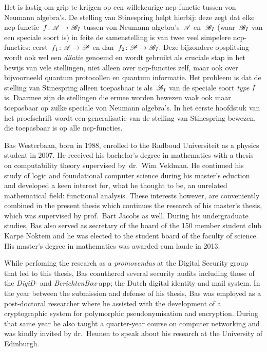 Het is lastig om grip te krijgen
    op een willekeurige ncp-functie
    tussen von Neumann algebra's.
De stelling van Stinespring helpt hierbij:
    deze zegt dat elke ncp-functie~$f\colon \mathscr{A} \to \mathscr{B}_I$
    tussen von Neumann algebra's~$\mathscr{A}$ en~$\mathscr{B}_I$
        (waar~$\mathscr{B}_I$ van een speciale soort is)
        in feite de samenstelling is
        van twee veel simpelere ncp-functies:
        eerst~$f_1\colon \mathscr{A} \to \mathscr{P}$
            en dan~$f_2\colon \mathscr{P} \to \mathscr{B}_I$.
    Deze bijzondere opsplitsing wordt
        ook wel een \emph{dilatie} genoemd
            en wordt gebruikt als cruciale stap in het
    bewijs van vele stellingen, niet alleen over ncp-functies zelf,
    maar ook over bijvoorneeld quantum protocollen en quantum informatie.
Het probleem is dat de stelling van Stinespring alleen toepasbaar
    is als~$\mathscr{B}_I$ van de speciale soort \emph{type I} is.
Daarmee zijn de stellingen die ermee worden bewezen vaak ook maar toepasbaar
    op zulke speciale von Neumann algebra's.
In het eerste hoofdstuk van het proefschrift
    wordt een generalisatie van de stelling van Stinespring
    bewezen, die toepasbaar is op alle ncp-functies.




Bas Westerbaan, born in 1988,
    enrolled to the Radboud Universiteit
     as a physics student in 2007.
He received his bachelor's degree in
    mathematics with a thesis on computability theory
    supervised by~dr.~Wim Veldman.
He continued his study of logic and foundational computer science
    during his master's eduction and developed a keen interest for,
     what he thought to be, an unrelated mathematical field:
        functional analysis.
These interests however, are conveniently combined in the present thesis
    which continues the research of his master's thesis,
    which was supervised by prof.~Bart Jacobs as well.
During his undergraduate studies,
    Bas also served as secretary of the board of the 150 member student club
        Karpe Noktem and he was elected to
        the student board of the faculty of science.
His master's degree in mathematics was awarded cum laude in 2013.

While perfoming the research as a \emph{promovendus}
    at the Digital Security group that led to this thesis,
    Bas coauthered several security audits
        including those of the \emph{DigiD-} and \emph{BerichtenBox}-app;
        the Dutch digital identity and mail system. 
In the year between the submission and defense
    of his thesis, Bas was employed as a post-doctoral researcher
    where he assisted with the development of a cryptographic system
    for polymorphic pseudonymisation and encryption.
During that same year he also taught a quarter-year course on
    computer networking
        and was kindly invited by dr.~Heunen
        to speak about his research at the University of Edinburgh.

